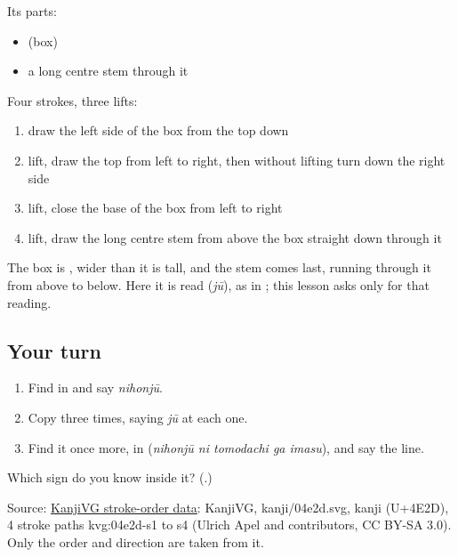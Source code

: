 Its parts:

\begin{itemize}
\raggedright
  \item {} (box)
  \item a long centre stem through it
\end{itemize}

Four strokes, three lifts:

\begin{enumerate}
\raggedright
  \item draw the left side of the box from the top down
  \item lift, draw the top from left to right, then without lifting turn down the right side
  \item lift, close the base of the box from left to right
  \item lift, draw the long centre stem from above the box straight down through it
\end{enumerate}

The box is \textbf{}, wider than it is tall, and the stem comes last, running through it from above to below. Here it is read \textbf{} (\emph{jū}), as in \textbf{}; this lesson asks only for that reading.

\subsection*{Your turn}
\begin{enumerate}
\raggedright
  \item Find \textbf{} in \textbf{} and say \emph{nihonjū}.
  \item Copy \textbf{} three times, saying \emph{jū} at each one.
  \item Find it once more, in \textbf{  } (\emph{nihonjū ni tomodachi ga imasu}), and say the line.
\end{enumerate}

\begin{tcolorbox}[breakable,colback=teal!4,colframe=teal!35!black,title={Before you move on}]
Which sign do you know inside it? (\textbf{}.)

Source: \href{https://github.com/KanjiVG/kanjivg/blob/master/kanji/04e2d.svg}{KanjiVG stroke-order data}: KanjiVG, kanji/04e2d.svg, kanji  (U+4E2D), 4 stroke paths kvg:04e2d-s1 to s4 (Ulrich Apel and contributors, CC BY-SA 3.0). Only the order and direction are taken from it.
\end{tcolorbox}
